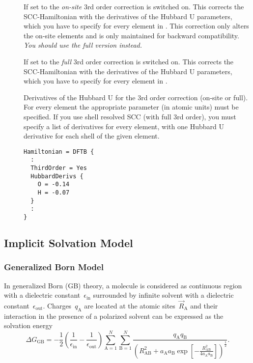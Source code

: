 \begin{description}

\item[] If set to  the \textit{on-site} 3rd order
  correction \cite{yang-JPCA-111-10861} is switched on. This corrects the
  SCC-Hamiltonian with the derivatives of the Hubbard U parameters, which you
  have to specify for every element in . This correction only
  alters the on-site elements and is only maintained for backward
  compatibility. \emph{You should use the full version 
    instead.}

\item[] If set to  the \textit{full} 3rd order
  correction \cite{gauss-jctc-7-931} is switched on. This corrects the
  SCC-Hamiltonian with the derivatives of the Hubbard U parameters, which you
  have to specify for every element in .

\item[] Derivatives of the Hubbard U for the 3rd order
  correction (on-site or full). For every element the appropriate parameter (in
  atomic units) must be specified. If you use shell resolved SCC (with full
  3rd order), you must specify a list of derivatives for every element, with one
  Hubbard U derivative for each shell of the given element.
\begin{verbatim}
Hamiltonian = DFTB {
  :
  ThirdOrder = Yes
  HubbardDerivs {
    O = -0.14
    H = -0.07
  }
  :
}
\end{verbatim}
\end{description}

\subsection{Implicit Solvation Model}
\label{sec:dftbp.Solvation}

\subsubsection{Generalized Born Model}
\label{sec:dftbp.GeneralizedBorn}

In generalized Born (GB) theory,\cite{onufriev2019} a molecule is considered as
continuous region with a dielectric constant~$\epsilon_\text{in}$ surrounded by
infinite solvent with a dielectric constant~$\epsilon_\text{out}$.
Charges~$q_\text{A}$ are located at the atomic sites~$\vec R_\text{A}$
and their interaction in the presence of a polarized solvent can be
expressed as the solvation energy
%
\begin{equation}
  \Delta G_\text{GB} =
  -\frac12 \left(\frac1{\epsilon_\text{in}}-\frac1{\epsilon_\text{out}}\right)
  \sum_{\text{A}=1}^N\sum_{\text{B}=1}^N\frac{q_\text{A}q_\text{B}}
  {\left(R^2_\text{AB} + a_\text{A}a_\text{B}\exp\left[-\frac{R^2_\text{AB}}
  {4a_\text{A}a_\text{B}}\right]\right)^{\frac12}}.
\end{equation}

